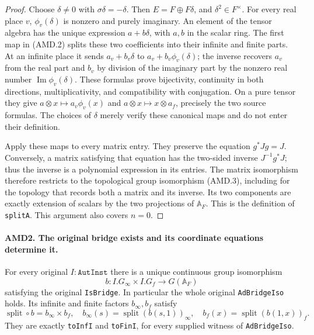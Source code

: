 \begin{proof}
Choose \(\delta\ne0\) with \(\sigma\delta=-\delta\).
Then \(E=F\oplus F\delta\), and \(\delta^2\in F^\times\).
For every real place \(v\), \(\phi_v(\delta)\) is nonzero
and purely imaginary.  An element of the tensor algebra has the
unique expression \(a+b\delta\), with \(a,b\) in the scalar
ring.  The first map in (AMD.2) splits these two coefficients into
their infinite and finite parts.  At an infinite place it sends
\(a_v+b_v\delta\) to \(a_v+b_v\phi_v(\delta)\); the inverse
recovers \(a_v\) from the real part and \(b_v\) by division of
the imaginary part by the nonzero real number
\(\operatorname{Im}\phi_v(\delta)\).  These formulas prove
bijectivity, continuity in both directions, multiplicativity, and
compatibility with conjugation.  On a pure tensor they give
\(a\otimes x\mapsto a_v\phi_v(x)\) and
\(a\otimes x\mapsto x\otimes a_f\), precisely the two source
formulas.  The choices of \(\delta\) merely verify these canonical
maps and do not enter their definition.

Apply these maps to every matrix entry.  They preserve the equation
\(g^*Jg=J\).  Conversely, a matrix satisfying that equation has
the two-sided inverse \(J^{-1}g^*J\); thus the inverse is a
polynomial expression in its entries.  The matrix isomorphism
therefore restricts to the topological group isomorphism (AMD.3),
including for the topology that records both a matrix and its
inverse.  Its two components are exactly extension of scalars by
the two projections of \(\mathbb A_F\).  This is the definition
of \texttt{splitA}.  This argument also covers \(n=0\).
\end{proof}

\paragraph{AMD2. The original bridge exists and its coordinate equations determine it.}
\label{claim:AMD2}
For every original \(I:\texttt{AutInst}\) there is a unique
continuous group isomorphism
\[
 b:I.G_\infty\times I.G_f\longrightarrow
                          G(\mathbb A_F)
 \tag{AMD.4}
\]
satisfying the original \texttt{IsBridge}.  In particular the
whole original \texttt{AdBridgeIso} holds.  Its infinite and
finite factors \(b_\infty,b_f\) satisfy
\[
 \operatorname{split}\circ b=b_\infty\times b_f,
 \quad
 b_\infty(s)=\operatorname{split}(b(s,1))_\infty,
 \quad
 b_f(x)=\operatorname{split}(b(1,x))_f.
 \tag{AMD.5}
\]
They are exactly \texttt{toInfI} and \texttt{toFinI}, for every
supplied witness of \texttt{AdBridgeIso}.

